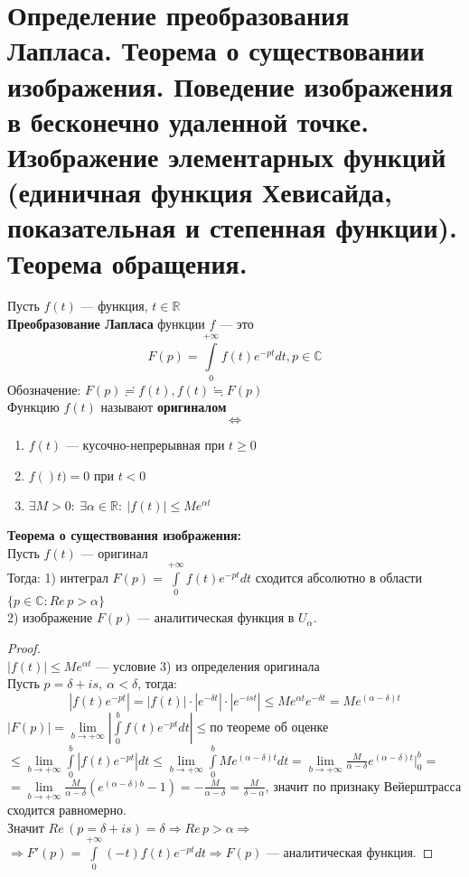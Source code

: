 \newpage
\section{Определение преобразования Лапласа. Теорема о существовании изображения. Поведение изображения в бесконечно удаленной точке. Изображение элементарных функций (единичная функция Хевисайда, показательная и степенная функции). Теорема обращения.}


Пусть $f(t)$ --- функция, $t \in \mathbb{R}$\\
\textbf{Преобразование Лапласа} функции $f$ --- это $$F(p)=\int\limits_{0}^{+\infty}f(t)e^{-pt}dt, p \in \mathbb{C}$$
Обозначение: $F(p)\risingdotseq f(t), f(t)\fallingdotseq F(p)$\\[2mm]
Функцию $f(t)$ называют \textbf{оригиналом}
$$\Leftrightarrow$$
\begin{enumerate}
    \item $f(t)$ --- кусочно-непрерывная при $t\geq 0$
    \item $f()t)=0$ при $t<0$
    \item $\exists M > 0: \ \exists \alpha \in \mathbb{R}: \ |f(t)|\leq M e^{\alpha t}$
\end{enumerate}


\textbf{Теорема о существования изображения:}\\[2mm]
Пусть $f(t)$ --- оригинал\\
Тогда: 1) интеграл $F(p)=\int\limits_{0}^{+\infty} f(t)e^{-pt}dt$ сходится абсолютно в области $\{p\in\mathbb{C}: Re\,p>\alpha\}$\\
2) изображение $F(p)$ --- аналитическая функция в $U_{\alpha}$.

\begin{proof}
    \ \\
    $|f(t)|\leq M e^{\alpha t}$ --- условие 3) из определения оригинала\\
    Пусть $p=\delta +i s, \ \alpha < \delta$, тогда:
    $$|f(t)e^{-pt}|=|f(t)|\cdot|e^{-\delta t}|\cdot |e^{-ist}|\leq M e^{\alpha t}e^{-\delta t}=Me^{(\alpha-\delta)t}$$
    $|F(p)|=\lim\limits_{b\to + \infty} \left| \int\limits_{0}^{b}f(t)e^{-pt}dt \right| \leq \text{по теореме об оценке}$\\
    $\leq \lim\limits_{b\to +\infty}\int\limits_{0}^{b}|f(t)e^{-pt}|dt \leq \lim\limits_{b\to +\infty}\int\limits_0^b Me^{(\alpha-\delta)t}dt = \lim\limits_{b\to +\infty}\frac{M}{\alpha-\delta}e^{(\alpha -\delta)t}|_0^b=$\\
    $=\lim\limits_{b\to +\infty}\frac{M}{\alpha-\delta}(e^{(\alpha-\delta)b}-1)=-\frac{M}{\alpha-\delta}=\frac{M}{\delta-\alpha}$, значит по признаку Вейерштрасса сходится равномерно.\\
    Значит $Re\,(p=\delta+i s)=\delta \Rightarrow Re \, p>\alpha \Rightarrow$\\
    $\Rightarrow F'(p)=\int\limits_0^{+\infty} (-t)f(t)e^{-pt}dt \Rightarrow F(p)$ --- аналитическая функция.  
\end{proof}

